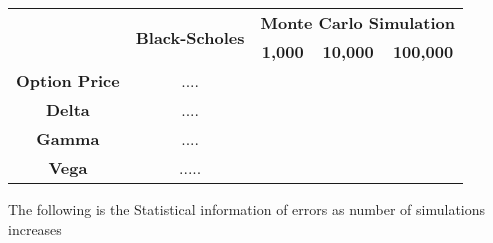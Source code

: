 \documentclass[12pt,a4paper,fleqn]{article}
\begin{document}
\begin{center}
\begin{tabular}{| c| c| c |c| c| }
\hline
\multirow{2}{*}{} & \multicolumn{1}{c|}{\multirow{2}{*}{\textbf{Black-Scholes}}} & \multicolumn{3}{l|}{\textbf{Monte Carlo Simulation}} \\ \cline{3-5} 
                  & \multicolumn{1}{c|}{}                                        & \textbf{1,000}  & \textbf{10,000} & \textbf{100,000} \\ \hline
\textbf{Option Price} &                  ....                                 &                 &                 &                  \\ \hline
\textbf{Delta}    &                  ....                                 &                 &                 &                  \\ \hline
\textbf{Gamma}    &                 ....                                       &                 &                 &                  \\ \hline
\textbf{Vega}    &                  .....                                    &                 &                 &                  \\ \hline

\end{tabular}
\end{center}


The following is the Statistical information of errors as number of simulations increases
\end{document}

